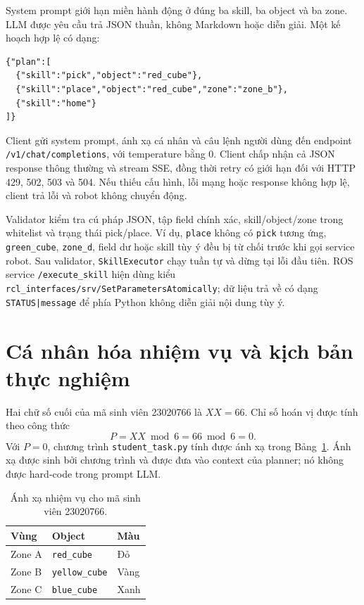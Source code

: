 \documentclass[12pt,a4paper]{article}
\begin{document}
System prompt giới hạn miền hành động ở đúng ba skill, ba object và ba zone. LLM được yêu cầu trả JSON thuần, không Markdown hoặc diễn giải. Một kế hoạch hợp lệ có dạng:

\begin{lstlisting}[language={},caption={Ví dụ kế hoạch JSON hợp lệ.},label={lst:json-plan}]
{"plan":[
  {"skill":"pick","object":"red_cube"},
  {"skill":"place","object":"red_cube","zone":"zone_b"},
  {"skill":"home"}
]}
\end{lstlisting}

Client gửi system prompt, ánh xạ cá nhân và câu lệnh người dùng đến endpoint \texttt{/v1/chat/completions}, với temperature bằng 0. Client chấp nhận cả JSON response thông thường và stream SSE, đồng thời retry có giới hạn đối với HTTP 429, 502, 503 và 504. Nếu thiếu cấu hình, lỗi mạng hoặc response không hợp lệ, client trả lỗi và robot không chuyển động.

Validator kiểm tra cú pháp JSON, tập field chính xác, skill/object/zone trong whitelist và trạng thái pick/place. Ví dụ, \texttt{place} không có \texttt{pick} tương ứng, \texttt{green\_cube}, \texttt{zone\_d}, field dư hoặc skill tùy ý đều bị từ chối trước khi gọi service robot. Sau validator, \texttt{SkillExecutor} chạy tuần tự và dừng tại lỗi đầu tiên. ROS service \texttt{/execute\_skill} hiện dùng kiểu \texttt{rcl\_interfaces/srv/SetParametersAtomically}; dữ liệu trả về có dạng \texttt{STATUS|message} để phía Python không diễn giải nội dung tùy ý.

\section{Cá nhân hóa nhiệm vụ và kịch bản thực nghiệm}

Hai chữ số cuối của mã sinh viên 23020766 là $XX=66$. Chỉ số hoán vị được tính theo công thức
\[
  P = XX \bmod 6 = 66 \bmod 6 = 0.
\]
Với $P=0$, chương trình \texttt{student\_task.py} tính được ánh xạ trong Bảng~\ref{tab:student-map}. Ánh xạ được sinh bởi chương trình và được đưa vào context của planner; nó không được hard-code trong prompt LLM.

\begin{table}[H]
  \centering
  \caption{Ánh xạ nhiệm vụ cho mã sinh viên 23020766.}
  \label{tab:student-map}
  \begin{tabular}{@{}lll@{}}
    \toprule
    \textbf{Vùng} & \textbf{Object} & \textbf{Màu} \\
    \midrule
    Zone A & \texttt{red\_cube} & Đỏ \\
    Zone B & \texttt{yellow\_cube} & Vàng \\
    Zone C & \texttt{blue\_cube} & Xanh \\
    \bottomrule
  \end{tabular}
\end{table}
\end{document}
